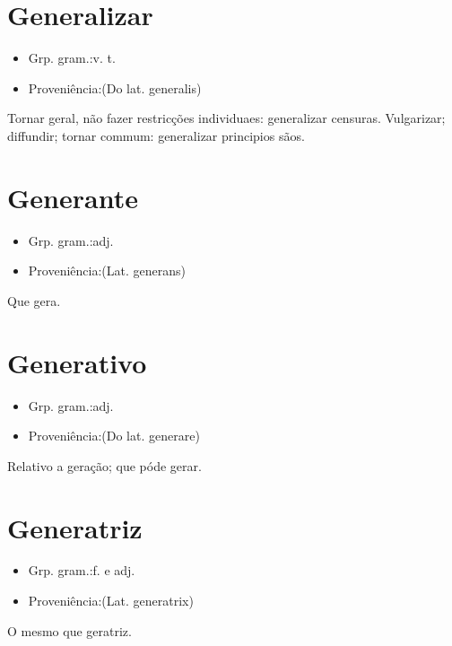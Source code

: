 \section{Generalizar}
\begin{itemize}
\item {Grp. gram.:v. t.}
\end{itemize}
\begin{itemize}
\item {Proveniência:(Do lat. \textunderscore generalis\textunderscore )}
\end{itemize}
Tornar geral, não fazer restricções individuaes: \textunderscore generalizar censuras\textunderscore .
Vulgarizar; diffundir; tornar commum: \textunderscore generalizar principios sãos\textunderscore .
\section{Generante}
\begin{itemize}
\item {Grp. gram.:adj.}
\end{itemize}
\begin{itemize}
\item {Proveniência:(Lat. \textunderscore generans\textunderscore )}
\end{itemize}
Que gera.
\section{Generativo}
\begin{itemize}
\item {Grp. gram.:adj.}
\end{itemize}
\begin{itemize}
\item {Proveniência:(Do lat. \textunderscore generare\textunderscore )}
\end{itemize}
Relativo a geração; que póde gerar.
\section{Generatriz}
\begin{itemize}
\item {Grp. gram.:f.  e  adj.}
\end{itemize}
\begin{itemize}
\item {Proveniência:(Lat. \textunderscore generatrix\textunderscore )}
\end{itemize}
O mesmo que \textunderscore geratriz\textunderscore .
